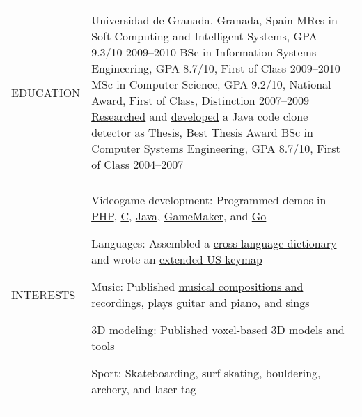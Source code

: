 \documentclass[letterpaper,10pt,oneside]{article}
\newcommand{\DatestampY}[1]{#1}
\newenvironment{body}
{\par\par
\begin{longtable}{p{0.142\textwidth}p{0.807\textwidth}}}
{\par\end{longtable}\par}
\renewcommand{\section}[3]{\\[-0.9cm]\pdfbookmark[2]{#2}{#3}\\%
\raggedleft  %
{\fontsize{9.5pt}{9.5pt}\selectfont\bfseries\raggedright%
\MakeUppercase{#1}}&}
\begin{document}
\begin{body}

\section{Education}{Education}{PDF:Education}

Universidad de Granada, Granada, Spain\newline
\phantom{w}MRes in Soft Computing and Intelligent Systems, GPA 9.3/10 \hfill \DatestampY{2009}--\DatestampY{2010} \newline
\phantom{w}BSc in Information Systems Engineering, GPA 8.7/10, First of Class \hfill \DatestampY{2009}--\DatestampY{2010} \newline
\phantom{w}MSc in Computer Science, GPA 9.2/10, National Award, First of Class, Distinction \hfill \DatestampY{2007}--\DatestampY{2009} \newline
\phantom{ww}\href{https://doi.org/10.5220/0003013403330336}{Researched} and \href{https://github.com/lquesada/JSimil}{developed} a Java code clone detector as Thesis, Best Thesis Award \newline
\phantom{w}BSc in Computer Systems Engineering, GPA 8.7/10, First of Class \hfill \DatestampY{2004}--\DatestampY{2007}


\section{Interests}{Interests}{PDF:Open Source}

Videogame development: Programmed demos in \href{https://github.com/lquesada/LifoSource}{PHP}, \href{https://github.com/lquesada/SpaceARMy}{C}, \href{https://github.com/lquesada/RogueCave}{Java}, \href{https://github.com/lquesada/PhysicsEngine}{GameMaker}, and \href{https://github.com/lquesada/Cavernal}{Go}

Languages: Assembled a \href{https://github.com/lquesada/Lingvaro}{cross-language dictionary} and wrote an \href{https://github.com/lquesada/ExtendedUSKeyboardLayout}{extended US keymap}

Music: Published \href{https://github.com/lquesada/music}{musical compositions and recordings}, plays guitar and piano, and sings

3D modeling: Published \href{https://github.com/lquesada/voxel-3d-models}{voxel-based 3D models and tools}

Sport: Skateboarding, surf skating, bouldering, archery, and laser tag

\end{body}
\end{document}
